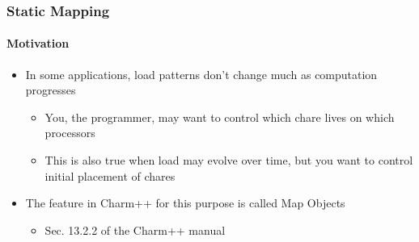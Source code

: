 


%
%
%
%
%



\begin{frame}[fragile]
  \frametitle{Static Mapping}
  \framesubtitle{Motivation}
  \begin{itemize}
    \item In some applications, load patterns don’t change much as computation progresses
    \begin{itemize}
      \item You, the programmer, may want to control which chare lives on which processors
      \item This is also true when  load may evolve over time, but you want to control initial placement of chares
    \end{itemize}
    \item The feature in Charm++ for this purpose is called Map Objects
    \begin{itemize}
      \item Sec. 13.2.2 of the Charm++ manual
    \end{itemize}
  \end{itemize}
\end{frame}

